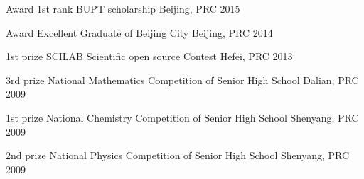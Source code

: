 \begin{cvhonors}







\cvhonor
{Award} %
{1st rank BUPT scholarship} %
{Beijing, PRC} %
{2015} %


\cvhonor
{Award} %
{Excellent Graduate of Beijing City} %
{Beijing, PRC} %
{2014} %



\cvhonor
{1st prize} %
{SCILAB Scientific open source Contest} %
{Hefei, PRC} %
{2013} %


\cvhonor
{3rd prize} %
{National Mathematics Competition of Senior High School} %
{Dalian, PRC} %
{2009} %

\cvhonor
{1st prize} %
{National Chemistry Competition of Senior High School} %
{Shenyang, PRC} %
{2009} %

\cvhonor
{2nd prize} %
{National Physics Competition of Senior High School} %
{Shenyang, PRC} %
{2009} %


\end{cvhonors}
